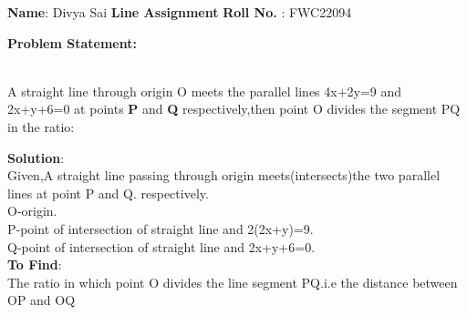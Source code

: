 \documentclass[10pt,a4paper]{report}
\begin{document}
\raggedright \textbf{Name}:\hspace{1mm} Divya Sai\hspace{3cm} \Large \textbf{Line Assignment}\hspace{2.5cm} %
\normalsize \textbf{Roll No.} :\hspace{1mm} FWC22094\vspace{1cm}
\\
\raggedright \textbf{Problem Statement:}\vspace{2mm}
\raggedright \\A straight line through origin O meets the parallel lines 4x+2y=9 and 2x+y+6=0 at points \textbf{P} and \textbf{Q} respectively,then point O divides the segment PQ in the ratio:\\
\vspace{5mm}
\raggedright \textbf{Solution}:\vspace{2mm}\\
Given,A straight line passing through origin meets(intersects)the two parallel lines at point P and Q.
\vspace{1mm} respectively.\vspace{2mm}\\
O-origin.\\
P-point of intersection of straight line and 2(2x+y)=9.\\
Q-point of intersection of straight line and 2x+y+6=0.\\
\vspace{2mm}
\textbf{To Find}:\vspace{2mm}\\
The ratio in which point O divides the line segment PQ.\hspace{2mm}i.e     the distance between OP and OQ
\\ \vspace{2mm}
\end{document}

